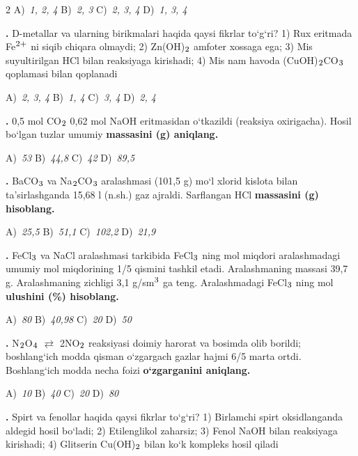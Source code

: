 \documentclass[11pt,a4paper]{article}
\renewcommand{\textsubscript}[1]{\ensuremath{_{\text{\fontsize{8}{8}\selectfont #1}}}}
\renewcommand{\textsuperscript}[1]{\ensuremath{^{\text{\fontsize{8}{8}\selectfont #1}}}}
\newcommand{\qn}[1]{\textbf{\fontsize{11.5}{13}\selectfont #1}}
\newcommand{\qsep}{\par\vspace{13pt}}
\begin{document}
\begin{multicols}{2}
\noindent A)~\textsl{1, 2, 4} \hfill B)~\textsl{2, 3} \hfill C)~\textsl{2, 3, 4} \hfill D)~\textsl{1, 3, 4}\par
\qsep
\noindent\qn{15.} D-metallar va ularning birikmalari haqida qaysi fikrlar to`g`ri? 1) Rux eritmada Fe\textsuperscript{2+} ni siqib chiqara olmaydi; 2) Zn(OH)\textsubscript{2} amfoter xossaga ega; 3) Mis suyultirilgan HCl bilan reaksiyaga kirishadi; 4) Mis nam havoda (CuOH)\textsubscript{2}CO\textsubscript{3} qoplamasi bilan qoplanadi

\noindent A)~\textsl{2, 3, 4} \hfill B)~\textsl{1, 4} \hfill C)~\textsl{3, 4} \hfill D)~\textsl{2, 4}\par
\qsep
\noindent\qn{16.} 0,5 mol CO\textsubscript{2} 0,62 mol NaOH eritmasidan o`tkazildi (reaksiya oxirigacha). Hosil bo`lgan tuzlar umumiy \textbf{massasini (g) aniqlang.}

\noindent A)~\textsl{53} \hfill B)~\textsl{44,8} \hfill C)~\textsl{42} \hfill D)~\textsl{89,5}\par
\qsep
\noindent\qn{17.} BaCO\textsubscript{3} va Na\textsubscript{2}CO\textsubscript{3} aralashmasi (101,5 g) mo`l xlorid kislota bilan ta'sirlashganda 15,68 l (n.sh.) gaz ajraldi. Sarflangan HCl \textbf{massasini (g) hisoblang.}

\noindent A)~\textsl{25,5} \hfill B)~\textsl{51,1} \hfill C)~\textsl{102,2} \hfill D)~\textsl{21,9}\par
\qsep
\noindent\qn{18.} FeCl\textsubscript{3} va NaCl aralashmasi tarkibida FeCl\textsubscript{3} ning mol miqdori aralashmadagi umumiy mol miqdorining 1/5 qismini tashkil etadi. Aralashmaning massasi 39,7 g. Aralashmaning zichligi 3,1 g/sm\textsuperscript{3} ga teng. Aralashmadagi FeCl\textsubscript{3} ning mol \textbf{ulushini (\%) hisoblang.}

\noindent A)~\textsl{80} \hfill B)~\textsl{40,98} \hfill C)~\textsl{20} \hfill D)~\textsl{50}\par
\qsep
\noindent\qn{19.} N\textsubscript{2}O\textsubscript{4} $\rightleftarrows$ 2NO\textsubscript{2} reaksiyasi doimiy harorat va bosimda olib borildi; boshlang`ich modda qisman o`zgargach gazlar hajmi 6/5 marta ortdi. Boshlang`ich modda necha foizi \textbf{o`zgarganini aniqlang.}

\noindent A)~\textsl{10} \hfill B)~\textsl{40} \hfill C)~\textsl{20} \hfill D)~\textsl{80}\par
\qsep
\noindent\qn{20.} Spirt va fenollar haqida qaysi fikrlar to`g`ri? 1) Birlamchi spirt oksidlanganda aldegid hosil bo`ladi; 2) Etilenglikol zaharsiz; 3) Fenol NaOH bilan reaksiyaga kirishadi; 4) Glitserin Cu(OH)\textsubscript{2} bilan ko`k kompleks hosil qiladi


\end{multicols}
\end{document}
